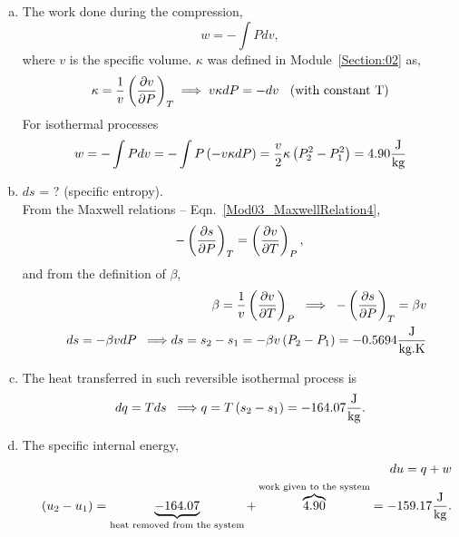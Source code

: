 \begin{enumerate}[1)]
       \begin{enumerate}[a)]
%
            \item The work done during the compression,
                \begin{displaymath}
                   w = -\int P dv,
                \end{displaymath}
                where $v$ is the specific volume. $\kappa$ was defined in Module~\ref{Section:02} as,
                \begin{displaymath}
                   \kappa = \displaystyle\frac{1}{v}\left(\displaystyle\frac{\partial v}{\partial P}\right)_{T}\;\Longrightarrow \; v\kappa dP = - dv \;\;\text{ (with constant T)}
                \end{displaymath}
                For isothermal processes
                \begin{displaymath}
                   w = -\int P dv = - \int P\left(-v\kappa dP\right) = \displaystyle\frac{v}{2}\kappa\left(P_{2}^{2}-P_{1}^{2}\right) = 4.90 \displaystyle\frac{\text{J}}{\text{kg}}
                \end{displaymath}
%
            \item $ds$ = ? (specific entropy).\\
                  From the Maxwell relations -- Eqn.~\ref{Mod03_MaxwellRelation4}, 
                \begin{displaymath}
                   -\left(\displaystyle\frac{\partial s}{\partial P}\right)_{T} = \left(\displaystyle\frac{\partial v}{\partial T}\right)_{P},
                \end{displaymath}
                and from the definition of $\beta$,
                \begin{eqnarray}
                    && \beta = \displaystyle\frac{1}{v}\left(\displaystyle\frac{\partial v}{\partial T}\right)_{P} \;\;\Longrightarrow\;\; -\left(\displaystyle\frac{\partial s}{\partial P}\right)_{T} = \beta v \nonumber \\
                    && ds = -\beta v dP \;\;\Longrightarrow ds = s_{2}-s_{1} = -\beta v \left(P_{2}-P_{1}\right) = -0.5694 \displaystyle\frac{\text{J}}{\text{kg.K}} \nonumber
                \end{eqnarray}
%
            \item The heat transferred in such reversible isothermal process is
                \begin{displaymath}
                   dq = Tds \;\;\Longrightarrow q = T\left(s_{2}-s_{1}\right) = -164.07 \displaystyle\frac{\text{J}}{\text{kg}}.
                \end{displaymath}
%
            \item The specific internal energy,
                \begin{eqnarray}
                   &&  du = q + w \nonumber \\
                   && \left(u_{2}-u_{1}\right) = \underbrace{-164.07}_{\text{heat removed from the system}} + \overbrace{4.90}^{\text{work given to the system}} = -159.17 \displaystyle\frac{\text{J}}{\text{kg}}. \nonumber
                \end{eqnarray}
 

\end{enumerate}
\end{enumerate}
